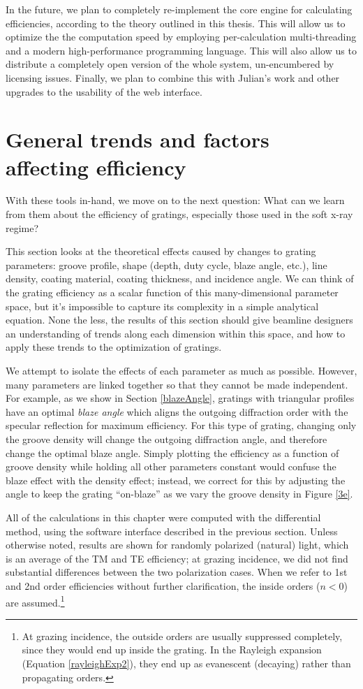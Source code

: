 In the future, we plan to completely re-implement the core engine for calculating efficiencies, according to the theory outlined in this thesis.  This will allow us to optimize the the computation speed by employing per-calculation multi-threading and a modern high-performance programming language.  This will also allow us to distribute a completely open version of the whole system, un-encumbered by licensing issues.  Finally, we plan to combine this with Julian's work and other upgrades to the usability of the web interface.

\section{General trends and factors affecting efficiency}
With these tools in-hand, we move on to the next question: What can we learn from them about the efficiency of gratings, especially those used in the soft x-ray regime?

This section looks at the theoretical effects caused by changes to grating parameters: groove profile, shape (depth, duty cycle, blaze angle, etc.), line density, coating material, coating thickness, and incidence angle.  We can think of the grating efficiency as a scalar function of this many-dimensional parameter space, but it's impossible to capture its complexity in a simple analytical equation.  None the less, the results of this section should give beamline designers an understanding of trends along each dimension within this space, and how to apply these trends to the optimization of gratings.

We attempt to isolate the effects of each parameter as much as possible.  However, many parameters are linked together so that they cannot be made independent.  For example, as we show in Section \ref{blazeAngle}, gratings with triangular profiles have an optimal \emph{blaze angle} which aligns the outgoing diffraction order with the specular reflection for maximum efficiency.  For this type of grating, changing only the groove density will change the outgoing diffraction angle, and therefore change the optimal blaze angle.  Simply plotting the efficiency as a function of groove density while holding all other parameters constant would confuse the blaze effect with the density effect; instead, we correct for this by adjusting the angle to keep the grating ``on-blaze'' as we vary the groove density in Figure \ref{3e}.

All of the calculations in this chapter were computed with the differential method, using the software interface described in the previous section.  Unless otherwise noted, results are shown for randomly polarized (natural) light, which is an average of the TM and TE efficiency; at grazing incidence, we did not find substantial differences between the two polarization cases.  When we refer to 1st and 2nd order efficiencies without further clarification, the inside orders ($n<0$) are assumed.\footnote{At grazing incidence, the outside orders are usually suppressed completely, since they would end up inside the grating. In the Rayleigh expansion (Equation \ref{rayleighExp2}), they end up as evanescent (decaying) rather than propagating orders.}
